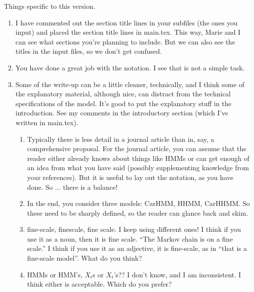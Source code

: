 Things specific to this version.
\begin{enumerate}
    \item I have commented out the section title lines in your subfiles (the ones you input) and placed the section title lines in main.tex.  This way, Marie and I can see what sections you're planning to include.  But we can also see the titles in the input files, so we don't get confused.
    \item You have done a great job with the notation. I see that is not a simple task. 
    \item
    Some of the write-up can be a little cleaner, technically, and I think some of the explanatory material, although nice, can distract from the technical specifications of the model.  It's good to put the explanatory stuff in the introduction.   See my comments in the introductory section (which I've written in main.tex).
    \begin{enumerate}
    \item Typically there is less detail in a journal article than in, say, a comprehensive proposal.  For the journal article, you can assume that the reader either already knows about things like HMMs or can get enough of an idea from what you have said (possibly supplementing knowledge from your references).   But it is useful to lay out the notation, as you have done. So ... there is a balance!
   \item
     In the end, you consider three models: CarHMM, HHMM, CarHHMM.  So these need to be sharply defined, so the reader can glance back and skim. 
     \item fine-scale, finescale, fine scale.  I keep using different ones!  I think if you use it as a noun, then it is fine scale.  ``The Markov chain is on a fine scale.''  I think if you use it as an adjective, it is fine-scale, as in ``that is a fine-scale model''. 
     What do you think?
     \item HMMs or HMM's,  $X_t$s or $X_t$'s??  I don't know, and I am inconsistent.  I think either is acceptable.  Which do you prefer?
\end{enumerate}
\end{enumerate}


